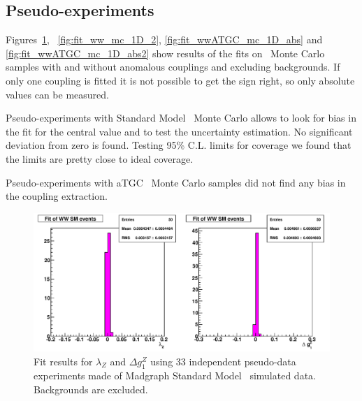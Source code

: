 \subsection{Pseudo-experiments}
Figures~\ref{fig:fit_ww_mc_1D},
~\ref{fig:fit_ww_mc_1D_2}, \ref{fig:fit_wwATGC_mc_1D_abs} and
\ref{fig:fit_wwATGC_mc_1D_abs2} show results of the fits on \ww\ Monte
Carlo samples with and without anomalous couplings and excluding
backgrounds. If only one coupling is fitted
it is not possible to get the sign right, so only absolute
values can be measured.

Pseudo-experiments with Standard Model \ww\ Monte Carlo allows to look
for bias in the fit for the central value and to test the uncertainty
estimation. No significant deviation from zero is found. Testing 95\%
C.L. limits for coverage we found that the limits are pretty close to
ideal coverage.

Pseudo-experiments with aTGC \ww\ Monte Carlo samples did not find any
bias in the coupling extraction. 

\begin{figure}[tp]
  \centerline{
    \includegraphics[width=1.0\textwidth]{figures/fit_ww_mc_1D}
  }

  \caption[1D fits to WW SM Monte Carlo] {Fit results for
  $\lambda_{Z}$ and $\Delta g^Z_1$ using 33 independent pseudo-data
  experiments made of Madgraph Standard Model \ww\ simulated
  data. Backgrounds are excluded.}

\label{fig:fit_ww_mc_1D}
\end{figure}

